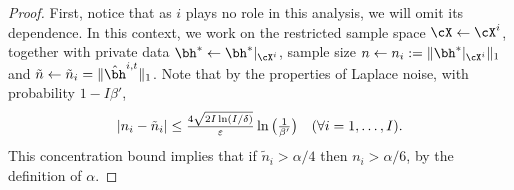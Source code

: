 \begin{proof}
First, notice that as $i$ plays no role in this analysis, we will omit its dependence. In this context, we work on the restricted sample space $\cX\gets\cX^i$, together with private data $\bh^{\ast}\gets \bh^{\ast}|_{\cX^i}$, sample size $n\gets n_i:=\|\bh^{\ast}|_{\cX^i}\|_1$ and $\tilde n\gets \tilde n_i=\|\hbh^{i,t}\|_1$. Note that by the properties of Laplace noise, with probability $1-I\beta'$, 
\begin{equation} \label{eqn:Laplace_concentration_MWU}
\textstyle |n_i-\tilde n_i|\leq \frac{4\sqrt{2I\ln(I/\delta)}}{\varepsilon}\ln\big(\frac{1}{\beta'}\big) \quad(\forall i=1,\ldots,I). 
\end{equation}
This concentration bound implies that if $\tilde n_i> \alpha/4$ then $n_i> \alpha/6$, by the definition of $\alpha$.



\end{proof}
